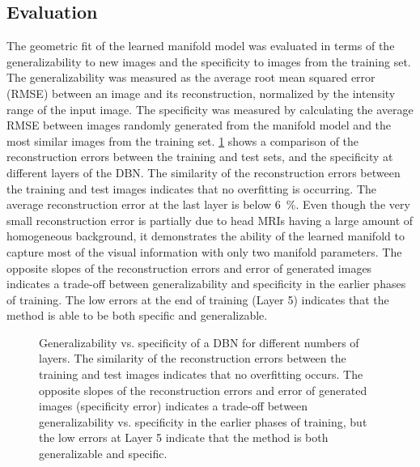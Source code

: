 \subsection{Evaluation}

The geometric fit of the learned manifold model was evaluated in terms of the
generalizability to new images and the specificity to images from the training
set. The generalizability was measured as the average root mean squared error
(RMSE) between an image and its reconstruction, normalized by the intensity
range of the input image. The specificity was measured by calculating the
average RMSE between images randomly generated from the manifold model and the
most similar images from the training set. \ref{fig:genspe} shows a
comparison of the reconstruction errors between the training and test sets, and
the specificity at different layers of the DBN. The similarity of the
reconstruction errors between the training and test images indicates that no
overfitting is occurring. The average reconstruction error at the last layer is
below \SI{6}{\percent}. Even though the very small reconstruction error is
partially due to head MRIs having a large amount of homogeneous background, it
demonstrates the ability of the learned manifold to capture most of the visual
information with only two manifold parameters. The opposite slopes of the
reconstruction errors and error of generated images indicates a trade-off
between generalizability and specificity in the earlier phases of training. The
low errors at the end of training (Layer 5) indicates that the method is able to
be both specific and generalizable.

\begin{figure}[tb]
\centering
  

\caption[Generalizability vs. specificity of a DBN for different numbers of
layers]{Generalizability vs. specificity of a DBN for different numbers of
layers. The similarity of the reconstruction errors between the training and
test images indicates that no overfitting occurs. The opposite slopes of the reconstruction errors and error of generated images (specificity error)
indicates a trade-off between generalizability vs. specificity in the earlier
phases of training, but the low errors at Layer 5 indicate that the method is
both generalizable and specific.}
\label{fig:genspe}
\end{figure}

